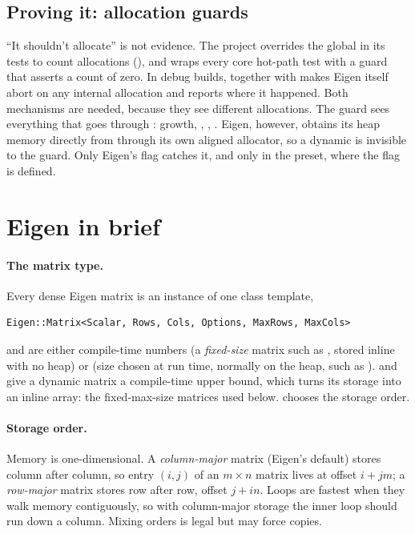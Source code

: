 \subsection{Proving it: allocation guards}

``It shouldn't allocate'' is not evidence. The project overrides the global  in its tests to count allocations
(), and wraps every core hot-path test with a guard that asserts a count of zero. In debug builds,
 together with  makes Eigen itself abort on any internal
allocation and reports where it happened. Both mechanisms are needed, because they see different allocations. The guard sees everything that goes
through :  growth, , , . Eigen, however, obtains its heap memory
directly from  through its own aligned allocator, so a dynamic  is invisible to the guard. Only Eigen's flag catches it,
and only in the  preset, where the flag is defined.

\section{Eigen in brief}
\label{sec:eigen-basics}

\paragraph{The matrix type.} Every dense Eigen matrix is an instance of one class template,
\begin{lstlisting}
Eigen::Matrix<Scalar, Rows, Cols, Options, MaxRows, MaxCols>
\end{lstlisting}
 and  are either compile-time numbers (a \emph{fixed-size} matrix such as , stored inline with no heap) or
 (size chosen at run time, normally on the heap, such as ).  and  give a dynamic
matrix a compile-time upper bound, which turns its storage into an inline array: the fixed-max-size matrices used below.  chooses the
storage order.

\paragraph{Storage order.} Memory is one-dimensional. A \emph{column-major} matrix (Eigen's default) stores column after column, so entry $(i, j)$ of
an $m\times n$ matrix lives at offset $i + jm$; a \emph{row-major} matrix stores row after row, offset $j + in$. Loops are fastest when they walk
memory contiguously, so with column-major storage the inner loop should run down a column. Mixing orders is legal but may force copies.

